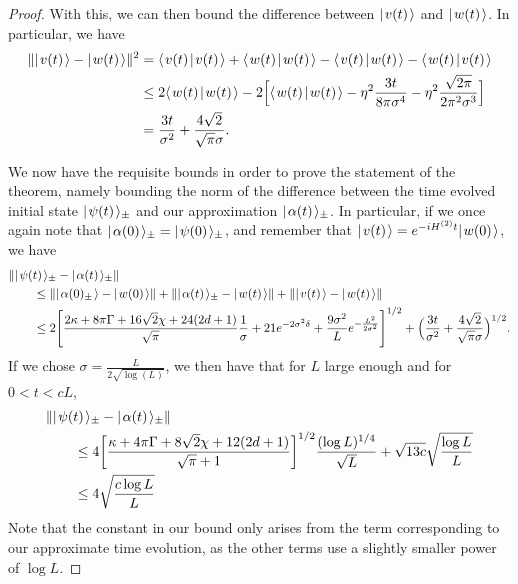 \documentclass[../thesis-main/thesis-main]{subfiles}
\begin{document}
\begin{proof}
With this, we can then bound the difference between $|\mspace{2mu} v(t) \mspace{2mu} \rangle$ and $|\mspace{2mu} w(t) \mspace{2mu} \rangle$.  In particular, we have
\begin{align}
  \|{|\mspace{2mu} v(t) \mspace{2mu} \rangle - |\mspace{2mu} w(t) \mspace{2mu} \rangle}\|^2 &= \langle\mspace{2mu} v(t) \mspace{2mu} | \mspace{2mu} v(t)\mspace{2mu} \rangle + \langle\mspace{2mu} w(t) \mspace{2mu} | \mspace{2mu} w(t)\mspace{2mu} \rangle - \langle\mspace{2mu} v(t) \mspace{2mu} | \mspace{2mu} w(t)\mspace{2mu} \rangle - \langle\mspace{2mu} w(t) \mspace{2mu} | \mspace{2mu} v(t)\mspace{2mu} \rangle\\
  & \leq  2 \langle\mspace{2mu} w(t) \mspace{2mu} | \mspace{2mu} w(t)\mspace{2mu} \rangle - 2 \Big[ \langle\mspace{2mu} w(t) \mspace{2mu} | \mspace{2mu} w(t)\mspace{2mu} \rangle  -\eta^2 \frac{3t}{8\pi \sigma^4} - \eta^2 \frac{\sqrt{2\pi}}{2 \pi^2 \sigma^3}\Big]\\
  & = \frac{3t}{\sigma^2} + \frac{4 \sqrt{2}}{\sqrt{\pi} \sigma}.
\end{align}


We now have the requisite bounds in order to prove the statement of the theorem, namely bounding the norm of the difference between the time evolved initial state $|\mspace{2mu} \psi(t) \mspace{2mu} \rangle_{\pm}$ and our approximation $|\mspace{2mu} \alpha(t) \mspace{2mu} \rangle_{\pm}$.  In particular, if we once again note that $|\mspace{2mu} \alpha(0) \mspace{2mu} \rangle_\pm = |\mspace{2mu} \psi(0) \mspace{2mu} \rangle_{\pm}$, and remember that $|\mspace{2mu} v(t) \mspace{2mu} \rangle = e^{- i H^{(2)} t} |\mspace{2mu} w(0) \mspace{2mu} \rangle$, we have
\begin{align}
  &\|{ |\mspace{2mu} \psi(t) \mspace{2mu} \rangle_{\pm} - |\mspace{2mu} \alpha(t) \mspace{2mu} \rangle_{\pm}}\| \nonumber\\
  &\qquad\leq \|{|\mspace{2mu} \alpha(0)_\pm \mspace{2mu} \rangle - |\mspace{2mu} w(0) \mspace{2mu} \rangle}\| + \|{ |\mspace{2mu} \alpha(t) \mspace{2mu} \rangle_{\pm} - |\mspace{2mu} w(t) \mspace{2mu} \rangle}\| + \|{|\mspace{2mu} v(t) \mspace{2mu} \rangle - |\mspace{2mu} w(t) \mspace{2mu} \rangle}\|\\
   & \qquad\leq 2 \Bigg[\frac{2\kappa + 8\pi \Gamma + 16\sqrt{2} \chi + 24(2d+1)}{\sqrt{\pi}} \frac{1}{\sigma}    + 21 e^{-2\sigma^2 \delta} + \frac{9 \sigma^2}{L} e^{-\frac{L^2}{2\sigma^2}}\Bigg]^{1/2} + \Big(\frac{3t}{\sigma^2} + \frac{4\sqrt{2}}{\sqrt{\pi} \sigma}\Big)^{1/2}.
\end{align}
If we chose $\sigma = \frac{ L}{2 \sqrt{\log(L)}}$, we then have that for $L$ large enough and for $0 < t < c L$,
\begin{align}
  &\|{ |\mspace{2mu} \psi(t) \mspace{2mu} \rangle_{\pm} - |\mspace{2mu} \alpha(t) \mspace{2mu} \rangle_{\pm}}\| \nonumber\\
  &\qquad\leq 4 \bigg[\frac{\kappa + 4\pi \Gamma + 8\sqrt{2} \chi + 12(2d+1)}{\sqrt{\pi}+1} \bigg]^{1/2}\frac{(\log L)^{1/4}}{\sqrt{L}} + \sqrt{13 c} \sqrt{ \frac{ \log L}{L}}\\
  & \qquad \leq 4\sqrt{\frac{c \log L}{L}}
\end{align}
Note that the constant in our bound only arises from the term corresponding to our approximate time evolution, as the other terms use a slightly smaller power of $\log L$.  
\end{proof}
\end{document}
